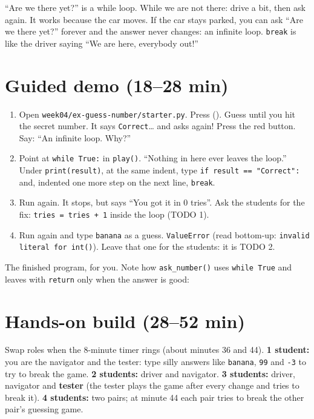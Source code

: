 \begin{analogy}
\enquote{Are we there yet?} is a while loop. While we are not there: drive a bit, then ask again. It works because the car moves.
If the car stays parked, you can ask \enquote{Are we there yet?} forever and the answer never changes: an infinite loop.
\texttt{break} is like the driver saying \enquote{We are here, everybody out!}
\end{analogy}

\section{Guided demo (18--28 min)}
\begin{workedexample}
\begin{enumerate}[leftmargin=1.4em]
  \item Open \texttt{week04/ex-guess-number/starter.py}. Press  (). Guess until you hit the secret number.
        It says \texttt{Correct}\ldots{} and asks again! Press the red  button. Say: \enquote{An infinite loop. Why?}
  \item Point at \texttt{while True:} in \texttt{play()}. \enquote{Nothing in here ever leaves the loop.} Under \texttt{print(result)}, at the same indent, type
        \texttt{if result == "Correct":} and, indented one more step on the next line, \texttt{break}.
  \item Run again. It stops, but says \enquote{You got it in 0 tries}. Ask the students for the fix: \texttt{tries = tries + 1} inside the loop (TODO 1).
  \item Run again and type \texttt{banana} as a guess. \texttt{ValueError} (read bottom-up: \texttt{invalid literal for int()}). Leave that one for the students: it is TODO 2.
\end{enumerate}
\end{workedexample}
The finished program, for you. Note how \texttt{ask\_number()} uses \texttt{while True} and leaves with \texttt{return} only when the answer is good:

\section{Hands-on build (28--52 min)}
\begin{pairroles}
Swap roles when the 8-minute timer rings (about minutes 36 and 44).
\textbf{1 student:} you are the navigator and the tester: type silly answers like \texttt{banana}, \texttt{99} and \texttt{-3} to try to break the game.
\textbf{2 students:} driver and navigator. \textbf{3 students:} driver, navigator and \textbf{tester} (the tester plays the game after every
change and tries to break it). \textbf{4 students:} two pairs; at minute 44 each pair tries to break the other pair's guessing game.
\end{pairroles}

